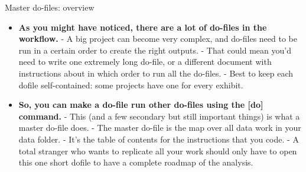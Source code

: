 \documentclass[aspectratio=169]{beamer}
\begin{document}
\begin{frame}{Master do-files: overview}

	\begin{itemize}[<default overlay specification>]
		\item<1> \textbf{As you might have noticed, there are a lot of do-files in the workflow.}
			\newline - A big project can become very complex, and do-files need to be run in a certain order to create the right outputs.
			\newline - That could mean you’d need to write one extremely long do-file, or a different document with instructions about in which order to run all the do-files.
			\newline - Best to keep each dofile self-contained: some projects have one for every exhibit.
		\item<1> \textbf{So, you can make a do-file run other do-files using the [do] command.}
			\newline - This (and a few secondary but still important things) is what a master do-file does.
			\newline - The master do-file is the map over all data work in your data folder.
			\newline - It’s the table of contents for the instructions that you code.
			\newline - A total stranger who wants to replicate all your work should only have to open this one short dofile to have a complete roadmap of the analysis.
	\end{itemize}

\end{frame}
\end{document}

